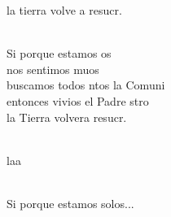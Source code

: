 \begin{cancion}
	la tierra volve a resucr.\\\jump\\
	\begin{chorus}%
	Si porque estamos os \\
	nos sentimos muos\\
	buscamos todos ntos la Comuni\\
	entonces vivios el Padre stro\\
	la Tierra volvera resucr.\\
	\end{chorus}%
	\jump\\
	laa    \\\jump\\
	\begin{chorus}%
Si porque estamos solos...\\
	\end{chorus}%
	\jump\\
\end{cancion}%
